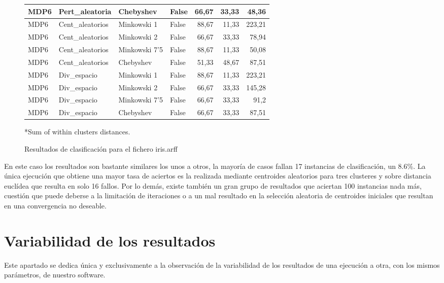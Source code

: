 \documentclass[a4paper]{report}
\begin{document}
\begin{figure}[htbp]
\begin{center}
\begin{tabular}{|l|l|l|l|r|r|r|}
				MDP6 & Pert\_aleatoria & Chebyshev & False & 66,67 & 33,33 & 48,36 \\ \hline
				MDP6 & Cent\_aleatorios & Minkowski 1 & False & 88,67 & 11,33 & 223,21 \\ \hline
				MDP6 & Cent\_aleatorios & Minkowski 2 & False & 66,67 & 33,33 & 78,94 \\ \hline
				MDP6 & Cent\_aleatorios & Minkowski 7'5 & False & 88,67 & 11,33 & 50,08 \\ \hline
				MDP6 & Cent\_aleatorios & Chebyshev & False & 51,33 & 48,67 & 87,51 \\ \hline
				MDP6 & Div\_espacio & Minkowski 1 & False & 88,67 & 11,33 & 223,21 \\ \hline
				MDP6 & Div\_espacio & Minkowski 2 & False & 66,67 & 33,33 & 145,28 \\ \hline
				MDP6 & Div\_espacio & Minkowski 7'5 & False & 66,67 & 33,33 & 91,2 \\ \hline
				MDP6 & Div\_espacio & Chebyshev & False & 66,67 & 33,33 & 87,51 \\ \hline
			\end{tabular}
			
		\end{center}
		*Sum of within clusters distances.
		\caption{Resultados de clasificación para el fichero iris.arff}
		\label{resiris_clasificacion}
	\end{figure}
	
	
	En este caso los resultados son bastante similares los unos a otros, la mayoría de casos fallan 17 instancias de clasificación, un 8.6\%. La única ejecución que obtiene una mayor tasa de aciertos es la realizada mediante centroides aleatorios para tres clusteres y sobre distancia euclídea que resulta en solo 16 fallos. Por lo demás, existe también un gran grupo de resultados que aciertan 100 instancias nada más, cuestión que puede deberse a la limitación de iteraciones o a un mal resultado en la selección aleatoria de centroides iniciales que resultan en una convergencia no deseable.
	
	
	\FloatBarrier
		
	\section{Variabilidad de los resultados}
	\label{resestadisticos}
	Este apartado se dedica única y exclusivamente a la observación de la variabilidad de los resultados de una ejecución a otra, con los mismos parámetros, de nuestro software.
	
\end{document}
